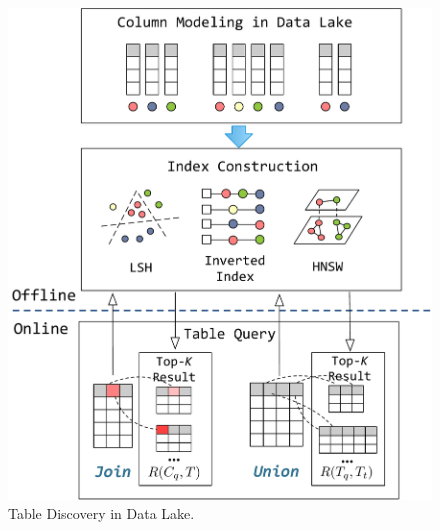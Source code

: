 \begin{figure}[h]
	\centering
	\includegraphics[width=0.95\linewidth]{fig/framework.pdf}
	\caption{Table Discovery in Data Lake.}
	\label{fig:framework}
\end{figure}

